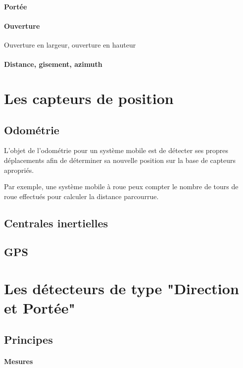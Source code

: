 \documentclass[12pt,a4paper]{report}
\begin{document}
\paragraph{Portée}
\paragraph{Ouverture} Ouverture en largeur, ouverture en hauteur

\paragraph{Distance, gisement, azimuth}




\section{Les capteurs de position}

\subsection{Odométrie}
L'objet de l'odométrie pour un système mobile est de détecter ses propres déplacements afin de déterminer sa nouvelle position sur la base de capteurs apropriés.


Par exemple, une système mobile à roue peux compter le nombre de tours de roue effectués pour calculer la distance parcourrue.


\subsection{Centrales inertielles}

\subsection{GPS}

\section{Les détecteurs de type "Direction et Portée"}

\subsection{Principes}

\paragraph{Mesures}
\end{document}
